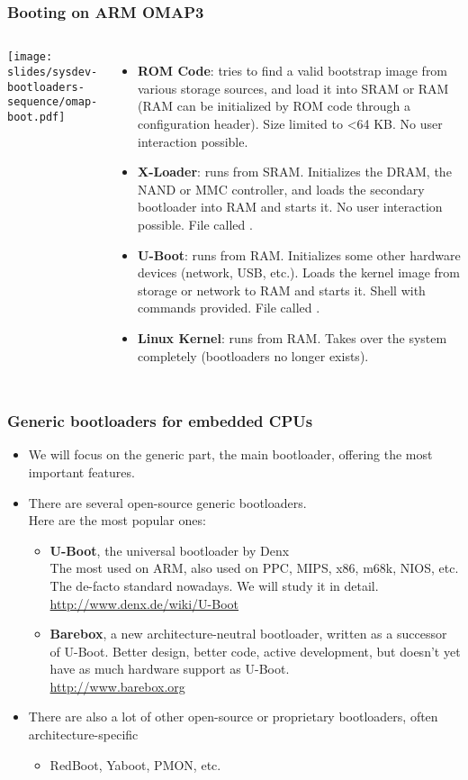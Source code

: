 \begin{frame}
\frametitle{Booting on ARM OMAP3}
  \begin{columns}
    \texttt{[image: slides/sysdev-bootloaders-sequence/omap-boot.pdf]}
    \footnotesize
    \begin{itemize}
    \item {\bf ROM Code}: tries to find a valid bootstrap image from
      various storage sources, and load it into SRAM or RAM (RAM can
      be initialized by ROM code through a configuration header). Size
      limited to \textless 64 KB. No user interaction possible.
    \item {\bf X-Loader}: runs from SRAM. Initializes the DRAM, the
      NAND or MMC controller, and loads the secondary bootloader into
      RAM and starts it. No user interaction possible. File called
      .
    \item {\bf U-Boot}: runs from RAM. Initializes some other hardware
      devices (network, USB, etc.).  Loads the kernel image from
      storage or network to RAM and starts it. Shell with commands
      provided. File called .
    \item {\bf Linux Kernel}: runs from RAM. Takes over the system
      completely (bootloaders no longer exists).
    \end{itemize}
  \end{columns}
\end{frame}

\begin{frame}
  \frametitle{Generic bootloaders for embedded CPUs}
  \begin{itemize}
  \item We will focus on the generic part, the main bootloader, offering
    the most important features.
  \item There are several open-source generic bootloaders.\\
    Here are the most popular ones:
    \begin{itemize}
    \item {\bf U-Boot}, the universal bootloader by Denx\\
      The most used on ARM, also used on PPC, MIPS, x86, m68k, NIOS,
      etc. The de-facto standard nowadays. We will study it in detail.\\
      \url{http://www.denx.de/wiki/U-Boot}
    \item {\bf Barebox}, a new architecture-neutral bootloader, written
      as a successor of U-Boot. Better design, better code, active
      development, but doesn't yet have as much hardware support as U-Boot.\\
      \url{http://www.barebox.org}
    \end{itemize}
  \item There are also a lot of other open-source or proprietary
    bootloaders, often architecture-specific
    \begin{itemize}
    \item RedBoot, Yaboot, PMON, etc.
    \end{itemize}
  \end{itemize}
\end{frame}
